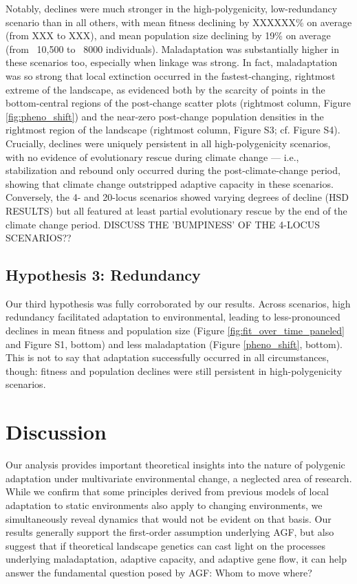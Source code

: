 \documentclass[9pt,twocolumn,twoside,lineno]{pnas-new}
\begin{document}
Notably, declines were much stronger in the high-polygenicity, low-redundancy scenario
than in all others, with mean fitness
declining by XXXXXX\% on average (from XXX to XXX),
and mean population size declining by 19\% on average (from ~10,500 to ~8000 individuals).
Maladaptation was substantially higher in these scenarios too,
especially when linkage was strong. 
In fact, maladaptation was so strong that local extinction occurred
in the fastest-changing, rightmost extreme of the landscape,
as evidenced both by the scarcity of points in the bottom-central regions
of the post-change scatter plots (rightmost column, Figure \ref{fig:pheno_shift})
and the near-zero post-change population densities in the rightmost region of the landscape
(rightmost column, Figure S3; cf. Figure S4).
Crucially, declines were uniquely persistent in all high-polygenicity scenarios,
with no evidence of evolutionary rescue during climate change --- i.e., stabilization and rebound only occurred during the post-climate-change period,  showing that climate change outstripped adaptive capacity in these scenarios.
Conversely, the 4- and 20-locus scenarios showed varying degrees
of decline (HSD RESULTS) but all featured at least partial evolutionary rescue by the end of the climate change period.
 DISCUSS THE 'BUMPINESS' OF THE 4-LOCUS SCENARIOS?? 





\subsection{Hypothesis 3: Redundancy}

Our third hypothesis was fully corroborated by our results.
Across scenarios, high redundancy facilitated adaptation to environmental,
leading to less-pronounced declines in mean fitness and population size
(Figure \ref{fig:fit_over_time_paneled} and Figure S1, bottom)
and less maladaptation (Figure \ref{pheno_shift}, bottom).
This is not to say that adaptation successfully occurred in all circumstances,
though: fitness and population declines were still persistent in high-polygenicity scenarios.



\section*{Discussion}

Our analysis provides important theoretical insights
into the nature of polygenic adaptation under multivariate environmental change,
a neglected area of research.
While we confirm that some principles derived from previous models of local adaptation to static environments
also apply to changing environments, we simultaneously
reveal dynamics that would not be evident on that basis.
Our results generally support the first-order assumption underlying AGF,
but also suggest that if theoretical landscape genetics can cast 
light on the processes underlying maladaptation, adaptive capacity, and adaptive gene
flow, it can help answer the fundamental question posed by AGF: Whom to move where?
\end{document}
